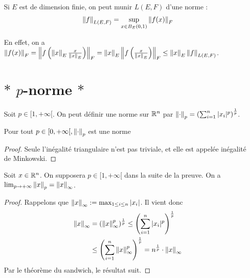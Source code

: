 \begin{notation}
    Si $E$ est de dimension finie, on peut munir $L(E,F)$ d'une norme :$$\left\| f \right\|_{L(E,F)} = \sup_{x\in B_E(0,1)}\left\| f(x) \right\|_F$$
\end{notation}
En effet, on a $\left\| f(x) \right\|_F = \left\| f\left(\left\| x \right\|_E\frac{x}{\left\| x \right\|_E}\right) \right\|_F = \left\| x \right\|_E\left\| f\left(\frac{x}{\left\| x \right\|_E}\right) \right\|_F\leq \left\| x \right\|_E\left\| f \right\|_{L(E,F)}$.

\section{\texorpdfstring{$*$ $p$-norme $*$}{* p-norme *}}
Soit $p\in[1,+\infty[$. On peut définir une norme sur $\mathbb{R} ^n$ par $\left\| \cdot \right\|_p = \left(\sum_{i=1}^n|x_i|^p\right)^{\frac 1 p}$.
\begin{proposition}
    Pour tout $p\in[0,+\infty[,\left\| \cdot \right\|_p$ est une norme
    \begin{proof}
        Seule l'inégalité triangulaire n'est pas triviale, et elle est appelée inégalité de Minkowski.
    \end{proof}
\end{proposition}
\begin{proposition}
    Soit $x\in\mathbb{R}^n$. On supposera $p\in[1,+\infty[ $ dans la suite de la preuve. On a $\lim_{p\to+\infty}\left\| x \right\|_p=\left\| x \right\| _\infty$.
\end{proposition}
    \begin{proof}
        Rappelons que $\left\| x \right\|_\infty:=\max_{1\leq i\leq n}\left| x_i \right|$. Il vient donc
        \begin{align*}
            \left\| x \right\|_\infty &= (\left\| x \right\|_\infty ^p)^{\frac 1 p}\leq\left(\sum_{i=1}^n|x_i|^p\right)^{\frac 1 p}\\
            &\leq\left(\sum_{i=1}^n\left\| x \right\|_\infty^p\right)^{\frac 1 p}=n^{\frac 1 p}\cdot\left\| x \right\|_\infty
        \end{align*}
        Par le théorème du sandwich, le résultat suit.
    \end{proof}

    